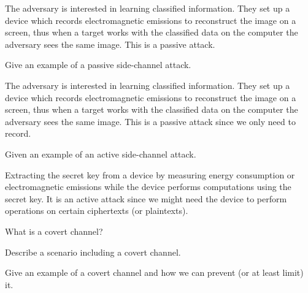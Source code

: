 \begin{solution}
  The adversary is interested in learning classified information.
  They set up a device which records electromagnetic emissions to reconstruct 
  the image on a screen, thus when a target works with the classified data on 
  the computer the adversary sees the same image.
  This is a passive attack.
\end{solution}


\question[3]\label{q:sidechannels}
Give an example of a passive side-channel attack.

\begin{solution}
  The adversary is interested in learning classified information.
  They set up a device which records electromagnetic emissions to reconstruct 
  the image on a screen, thus when a target works with the classified data on 
  the computer the adversary sees the same image.
  This is a passive attack since we only need to record.
\end{solution}


\question[3]\label{q:sidechannels}
Given an example of an active side-channel attack.

\begin{solution}
  Extracting the secret key from a device by measuring energy consumption or 
  electromagnetic emissions while the device performs computations using the 
  secret key.
  It is an active attack since we might need the device to perform operations 
  on certain ciphertexts (or plaintexts).
\end{solution}


\question\label{q:sidechannels}
What is a covert channel?


\question\label{q:sidechannels}
Describe a scenario including a covert channel.


\question\label{q:sidechannels}
Give an example of a covert channel and how we can prevent (or at least limit) 
it.
